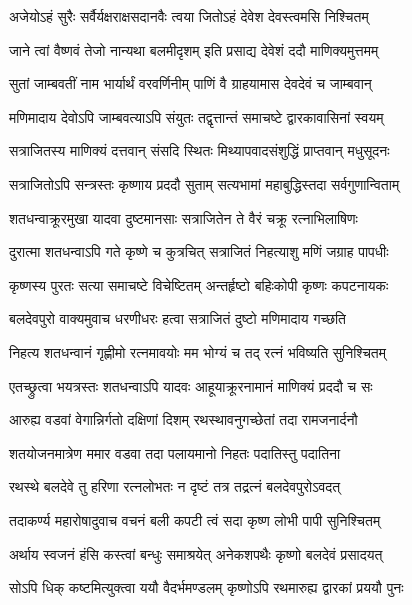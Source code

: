 \begin{center}

\twolineshloka
{अजेयोऽहं सुरैः सर्वैर्यक्षराक्षसदानवैः}
{त्वया जितोऽहं देवेश देवस्त्वमसि निश्चितम्}%

\twolineshloka
{जाने त्वां वैष्णवं तेजो नान्यथा बलमीदृशम्}
{इति प्रसाद्य देवेशं ददौ माणिक्यमुत्तमम्}%

\twolineshloka
{सुतां जाम्बवतीं नाम भार्यार्थं वरवर्णिनीम्}
{पाणिं वै ग्राहयामास देवदेवं च जाम्बवान्}%

\twolineshloka
{मणिमादाय देवोऽपि जाम्बवत्याऽपि संयुतः}
{तद्वृत्तान्तं समाचष्टे द्वारकावासिनां स्वयम्}%

\twolineshloka
{सत्राजितस्य माणिक्यं दत्तवान् संसदि स्थितः}
{मिथ्यापवादसंशुद्धिं प्राप्तवान् मधुसूदनः}%

\twolineshloka
{सत्राजितोऽपि सन्त्रस्तः कृष्णाय प्रददौ सुताम्}
{सत्यभामां महाबुद्धिस्तदा सर्वगुणान्विताम्}%

\twolineshloka
{शतधन्वाक्रूरमुखा यादवा दुष्टमानसाः}
{सत्राजितेन ते वैरं चक्रू रत्नाभिलाषिणः}%

\twolineshloka
{दुरात्मा शतधन्वाऽपि गते कृष्णे च कुत्रचित्}
{सत्राजितं निहत्याशु मणिं जग्राह पापधीः}%

\twolineshloka
{कृष्णस्य पुरतः सत्या समाचष्टे विचेष्टितम्}
{अन्तर्हृष्टो बहिःकोपी कृष्णः कपटनायकः}%

\twolineshloka
{बलदेवपुरो वाक्यमुवाच धरणीधरः}
{हत्वा सत्राजितं दुष्टो मणिमादाय गच्छति}%

\twolineshloka
{निहत्य शतधन्वानं गृह्णीमो रत्नमावयोः}
{मम भोग्यं च तद् रत्नं भविष्यति सुनिश्चितम्}%

\twolineshloka
{एतच्छ्रुत्वा  भयत्रस्तः शतधन्वाऽपि यादवः}
{आहूयाक्रूरनामानं माणिक्यं प्रददौ च सः}%

\twolineshloka
{आरुह्य वडवां वेगान्निर्गतो दक्षिणां दिशम्}
{रथस्थावनुगच्छेतां तदा रामजनार्दनौ}%

\twolineshloka
{शतयोजनमात्रेण ममार वडवा तदा}
{पलायमानो निहतः पदातिस्तु पदातिना}%

\twolineshloka
{रथस्थे बलदेवे तु हरिणा रत्नलोभतः}
{न दृष्टं तत्र तद्रत्नं बलदेवपुरोऽवदत्}%

\twolineshloka
{तदाकर्ण्य महारोषादुवाच वचनं बली}
{कपटी त्वं सदा कृष्ण लोभी पापी सुनिश्चितम्}%

\twolineshloka
{अर्थाय स्वजनं हंसि कस्त्वां बन्धुः समाश्रयेत्}
{अनेकशपथैः कृष्णो बलदेवं प्रसादयत्}%

\twolineshloka
{सोऽपि धिक् कष्टमित्युक्त्वा ययौ वैदर्भमण्डलम्}
{कृष्णोऽपि रथमारुह्य द्वारकां प्रययौ पुनः}%


\end{center}
